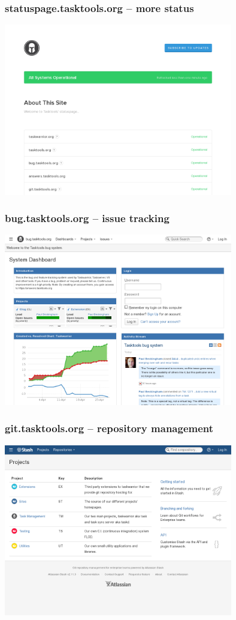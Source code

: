 \documentclass[t,handout]{beamer}
\begin{document}
\begin{frame}\frametitle{statuspage.tasktools.org -- more status}
\begin{center}
\href{http://statuspage.tasktools.org/}{\includegraphics[width=10cm,height=7.5cm]{statuspage-tasktools-org.png}}
\end{center}
\end{frame}

\begin{frame}\frametitle{bug.tasktools.org -- issue tracking}
\begin{center}
\href{https://bug.tasktools.org/}{\includegraphics[width=10cm,height=7.5cm]{bug-tasktools-org.png}}
\end{center}
\end{frame}

\begin{frame}\frametitle{git.tasktools.org -- repository management}
\begin{center}
\href{https://git.tasktools.org/}{\includegraphics[width=10cm,height=7.5cm]{git-tasktools-org.png}}
\end{center}
\end{frame}
\end{document}
